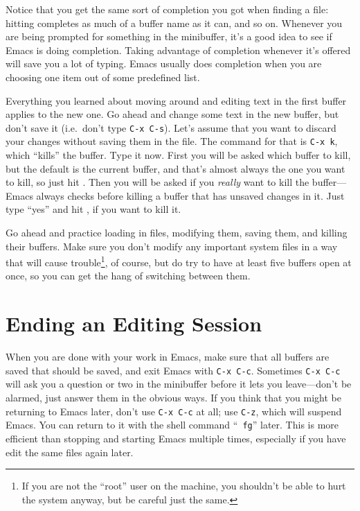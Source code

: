         Notice that you get the same sort of completion you got when
finding a file: hitting  completes as much of a buffer name
as it can, and so on.  Whenever you are being prompted for something
in the minibuffer, it's a good idea to see if Emacs is doing
completion.  Taking advantage of completion whenever it's offered will
save you a lot of typing.  Emacs usually does completion when you are
choosing one item out of some predefined list.

Everything you learned about moving around and editing text in the
first buffer applies to the new one.  Go ahead and change some text in
the new buffer, but don't save it (i.e.\ don't type {\tt C-x~C-s}).
Let's assume that you want to discard your changes without saving them
in the file.  The command for that is {\tt C-x~k}, which ``kills'' the
buffer.  Type it now.  First you will be asked which buffer to kill,
but the default is the current buffer, and that's almost always the
one you want to kill, so just hit .  Then you will be
asked if you {\em really\/} want to kill the buffer---Emacs always
checks before killing a buffer that has unsaved changes in it.  Just
type ``yes'' and hit , if you want to kill it.

        Go ahead and practice loading in files, modifying them, saving
them, and killing their buffers.  Make sure you don't modify any
important system files in a way that will cause trouble\footnote{If
you are not the ``root'' user on the machine, you shouldn't be able to
hurt the system anyway, but be careful just the same.}, of course, but
do try to have at least five buffers open at once, so you can get the
hang of switching between them.

\section{Ending an Editing Session}

When you are done with your work in Emacs, make sure that all buffers
are saved that should be saved, and exit Emacs with {\tt C-x~C-c}.
Sometimes {\tt C-x~C-c} will ask you a question or two in the
minibuffer before it lets you leave---don't be alarmed, just answer
them in the obvious ways.  If you think that you might be returning to
Emacs later, don't use {\tt C-x~C-c} at all; use {\tt C-z}, which will
suspend Emacs.  You can return to it with the shell command ``{\tt
  fg}'' later. This is more efficient than stopping and starting Emacs
multiple times, especially if you have edit the same files again
later.

